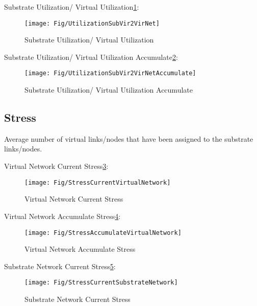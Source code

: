 Substrate Utilization/ Virtual Utilization\ref{fig:UtilizationSubVir2VirNet}:
\begin{figure}
  \centering
  \texttt{[image: Fig/UtilizationSubVir2VirNet]}\\
  \caption{Substrate Utilization/ Virtual Utilization}\label{fig:UtilizationSubVir2VirNet}
\end{figure}

Substrate Utilization/ Virtual Utilization Accumulate\ref{fig:UtilizationSubVir2VirNetAccumulate}:
\begin{figure}
  \centering
  \texttt{[image: Fig/UtilizationSubVir2VirNetAccumulate]}\\
  \caption{Substrate Utilization/ Virtual Utilization Accumulate}\label{fig:UtilizationSubVir2VirNetAccumulate}
\end{figure}


\subsection{Stress}
Average number of virtual links/nodes that have been assigned to the substrate links/nodes.

Virtual Network Current Stress\ref{fig:StressCurrentVirtualNetwork}:
\begin{figure}
  \centering
  \texttt{[image: Fig/StressCurrentVirtualNetwork]}\\
  \caption{Virtual Network Current Stress}\label{fig:StressCurrentVirtualNetwork}
\end{figure}

Virtual Network Accumulate Stress\ref{fig:StressAccumulateVirtualNetwork}:
\begin{figure}
  \centering
  \texttt{[image: Fig/StressAccumulateVirtualNetwork]}\\
  \caption{Virtual Network Accumulate Stress}\label{fig:StressAccumulateVirtualNetwork}
\end{figure}

Substrate Network Current Stress\ref{fig:StressCurrentSubstrateNetwork}:
\begin{figure}
  \centering
  \texttt{[image: Fig/StressCurrentSubstrateNetwork]}\\
  \caption{Substrate Network Current Stress}\label{fig:StressCurrentSubstrateNetwork}
\end{figure}

